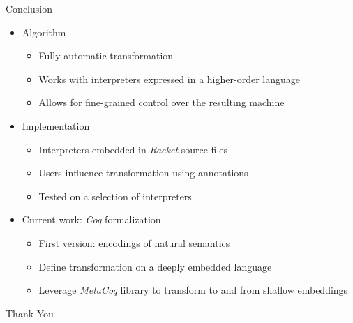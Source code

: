 \documentclass{beamer}
\begin{document}
\begin{frame}{Conclusion}
  \begin{itemize}
    \item Algorithm
    \begin{itemize}
      \item Fully automatic transformation
      \item Works with interpreters expressed in a higher-order language
      \item Allows for fine-grained control over the resulting machine
    \end{itemize}
    \pause
    \item Implementation
    \begin{itemize}
      \item Interpreters embedded in \textit{Racket} source files
      \item Users influence transformation using annotations
      \item Tested on a selection of interpreters
    \end{itemize}
    \pause
    \item Current work: \textit{Coq} formalization
    \begin{itemize}
      \item First version: encodings of natural semantics
      \item Define transformation on a deeply embedded language
      \item Leverage \textit{MetaCoq} library to transform to and from shallow embeddings
    \end{itemize}
  \end{itemize}  
\end{frame}

\begin{frame}
  \centering
  \huge Thank You
\end{frame}
\end{document}
